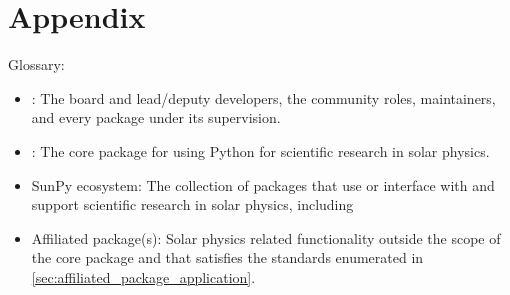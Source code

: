 \section*{Appendix}
\label{appendix}
Glossary:

\begin{itemize}
\item \sunpyproj: The board and lead/deputy developers, the community roles, maintainers, and every package under its supervision.
\item \sunpypkg: The core package for using Python for scientific research in solar physics. 
\item SunPy ecosystem: The collection of packages that use or interface with \sunpypkg and support scientific research in solar physics, including \sunpypkg
\item Affiliated package(s): Solar physics related functionality outside the scope of the \sunpypkg core package and that satisfies the standards enumerated in \autoref{sec:affiliated_package_application}.
\end{itemize}